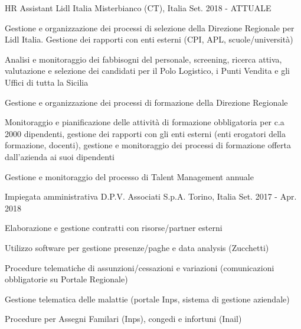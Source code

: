 


\begin{cventries}



  \cventry
	{HR Assistant} %
	{Lidl Italia} %
	{Misterbianco (CT), Italia} %
	{Set. 2018 - ATTUALE} %
	{
	  \begin{cvitems}
		\item {Gestione e organizzazione dei processi di selezione della Direzione Regionale per Lidl Italia.  Gestione dei rapporti con enti esterni (CPI, APL, scuole/università)}
		\item {Analisi e monitoraggio dei fabbisogni del personale, screening, ricerca attiva, valutazione e selezione dei candidati per il Polo Logistico, i Punti Vendita e gli Uffici di tutta la Sicilia}
		\item {Gestione e organizzazione dei processi di formazione della Direzione Regionale}
		\item {Monitoraggio e pianificazione delle attività di formazione obbligatoria per c.a 2000 dipendenti, gestione dei rapporti con gli enti esterni (enti erogatori della formazione, docenti), gestione e monitoraggio dei processi di formazione offerta dall’azienda ai suoi dipendenti}
		\item {Gestione e monitoraggio del processo di Talent Management annuale}
	  \end{cvitems}
	}


  \cventry
	{Impiegata amministrativa} %
	{D.P.V. Associati S.p.A.} %
	{Torino, Italia} %
	{Set. 2017 - Apr. 2018} %
	{
	  \begin{cvitems}
		\item {Elaborazione e gestione contratti con risorse/partner esterni}
		\item {Utilizzo software per gestione presenze/paghe e data analysis (Zucchetti)}
		\item {Procedure telematiche di assunzioni/cessazioni e variazioni (comunicazioni obbligatorie su Portale Regionale)}
		\item {Gestione telematica delle malattie (portale Inps, sistema di gestione aziendale)}
		\item {Procedure per Assegni Familari (Inps), congedi e infortuni (Inail)}
	  \end{cvitems}
	}



\end{cventries}

